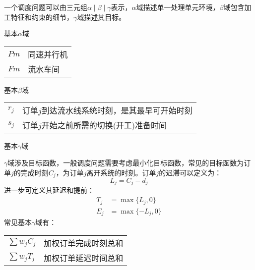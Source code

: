 一个调度问题可以由三元组$\alpha \mid \beta \mid \gamma$表示，$\alpha$域描述单一处理单元环境，$\beta$域包含加工特征和约束的细节，$\gamma$域描述其目标\cite{pinedo}。

\begin{asparaenum}
\item 基本$\alpha$域

\begin{supertabular}{ll}
$Pm$ & 同速并行机\\
$Fm$ & 流水车间\\
\end{supertabular}
\item 基本$\beta$域

\begin{supertabular}{ll}
$r_j$ & 订单$j$到达流水线系统时刻，是其最早可开始时刻\\
$s_j$ & 订单$j$开始之前所需的切换(开工)准备时间\\
\end{supertabular}
\item 基本$\gamma$域
\end{asparaenum}

$\gamma$域涉及目标函数，一般调度问题需要考虑最小化目标函数，常见的目标函数为订单$j$的完成时刻$C_j$，为订单$j$离开系统的时刻。订单$j$的迟滞可以定义为：
\[
L_j = C_j - d_j
\]
进一步可定义其延迟和提前：
\begin{align*}
T_j & = \max\{L_j,0\}\\
E_j & = \max\{-L_j,0\}
\end{align*}
常见基本$\gamma$域有：\\[3pt]
\begin{supertabular}{ll}
$\sum w_jC_j$ & 加权订单完成时刻总和 \\
$\sum w_jT_j$ & 加权订单延迟时间总和 \\
\end{supertabular}

